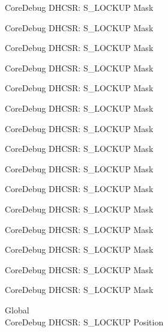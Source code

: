 \begin{DoxyRefList}
\label{deprecated__deprecated000114}%
%
Core\+Debug DHCSR\+: S\+\_\+\+LOCKUP Mask 

\label{deprecated__deprecated000168}%
%
Core\+Debug DHCSR\+: S\+\_\+\+LOCKUP Mask 

\label{deprecated__deprecated000253}%
%
Core\+Debug DHCSR\+: S\+\_\+\+LOCKUP Mask 

\label{deprecated__deprecated000310}%
%
Core\+Debug DHCSR\+: S\+\_\+\+LOCKUP Mask 

\label{deprecated__deprecated000386}%
%
Core\+Debug DHCSR\+: S\+\_\+\+LOCKUP Mask 

\label{deprecated__deprecated000473}%
%
Core\+Debug DHCSR\+: S\+\_\+\+LOCKUP Mask 

\label{deprecated__deprecated000575}%
%
Core\+Debug DHCSR\+: S\+\_\+\+LOCKUP Mask 

\label{deprecated__deprecated000700}%
%
Core\+Debug DHCSR\+: S\+\_\+\+LOCKUP Mask 

\label{deprecated__deprecated000792}%
%
Core\+Debug DHCSR\+: S\+\_\+\+LOCKUP Mask 

\label{deprecated__deprecated000846}%
%
Core\+Debug DHCSR\+: S\+\_\+\+LOCKUP Mask 

\label{deprecated__deprecated000931}%
%
Core\+Debug DHCSR\+: S\+\_\+\+LOCKUP Mask 

\label{deprecated__deprecated000988}%
%
Core\+Debug DHCSR\+: S\+\_\+\+LOCKUP Mask 

\label{deprecated__deprecated001064}%
%
Core\+Debug DHCSR\+: S\+\_\+\+LOCKUP Mask 

\label{deprecated__deprecated001151}%
%
Core\+Debug DHCSR\+: S\+\_\+\+LOCKUP Mask 

\label{deprecated__deprecated001253}%
%
Core\+Debug DHCSR\+: S\+\_\+\+LOCKUP Mask  
\item[Global \doxylink{group___c_m_s_i_s___core_debug_ga2900dd56a988a4ed27ad664d5642807e}{Core\+Debug\+\_\+\+DHCSR\+\_\+\+S\+\_\+\+LOCKUP\+\_\+\+Pos} ]\hfill \\
\label{deprecated__deprecated000021}%
%
Core\+Debug DHCSR\+: S\+\_\+\+LOCKUP Position 


\end{DoxyRefList}
